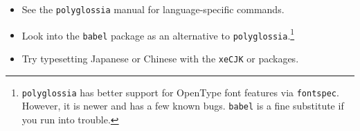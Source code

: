 \exercises{}
\begin{flushleft}
\begin{itemize}
\item See the \texttt{polyglossia} manual for language-specific commands.
\item Look into the \texttt{babel} package as an alternative to
    \texttt{polyglossia}.\punckern\footnote{\texttt{polyglossia} has better
    support for OpenType font features via \texttt{fontspec}.
    However, it is newer and has a few known bugs.
    \texttt{babel} is a fine substitute if you run into trouble.}
\item Try typesetting Japanese or Chinese with the \texttt{xeCJK} or
     packages.
\end{itemize}
\end{flushleft}
